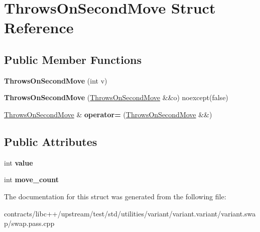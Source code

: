 \hypertarget{struct_throws_on_second_move}{}\section{Throws\+On\+Second\+Move Struct Reference}
\label{struct_throws_on_second_move}
\subsection*{Public Member Functions}
\begin{DoxyCompactItemize}
\item 
\mbox{\label{struct_throws_on_second_move_ae893880dc08915b0d8b6f21ff766fbbe}} 
{\bfseries Throws\+On\+Second\+Move} (int v)
\item 
\mbox{\label{struct_throws_on_second_move_a4b495f7711916ad44e39f2c64ceaafa7}} 
{\bfseries Throws\+On\+Second\+Move} (\mbox{\hyperlink{struct_throws_on_second_move}{Throws\+On\+Second\+Move}} \&\&o) noexcept(false)
\item 
\mbox{\label{struct_throws_on_second_move_a2a31b2ca1694b8f90dd4941fd12274ee}} 
\mbox{\hyperlink{struct_throws_on_second_move}{Throws\+On\+Second\+Move}} \& {\bfseries operator=} (\mbox{\hyperlink{struct_throws_on_second_move}{Throws\+On\+Second\+Move}} \&\&)
\end{DoxyCompactItemize}
\subsection*{Public Attributes}
\begin{DoxyCompactItemize}
\item 
\mbox{\label{struct_throws_on_second_move_a852019af5aa23779bcec47171d03022d}} 
int {\bfseries value}
\item 
\mbox{\label{struct_throws_on_second_move_a0cb2becc81270f14815c9c426b3655b3}} 
int {\bfseries move\+\_\+count}
\end{DoxyCompactItemize}


The documentation for this struct was generated from the following file\+:\begin{DoxyCompactItemize}
\item 
contracts/libc++/upstream/test/std/utilities/variant/variant.\+variant/variant.\+swap/swap.\+pass.\+cpp\end{DoxyCompactItemize}
